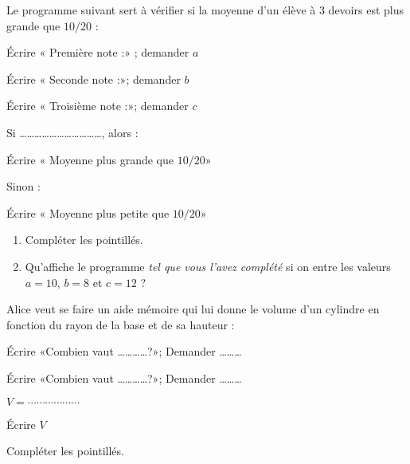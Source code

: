 
\begin{exercice}[\ldots/3]\label{exosmath-0599}

    \begin{multicols}{2}

    Le programme suivant sert à vérifier si la moyenne d'un élève à 3 devoirs est plus grande que \( 10/20\) :

    \begin{fmpage}{0.9\linewidth}

    Écrire « Première note :» ; demander \( a\)

    Écrire « Seconde note :»;   demander \( b\)

    Écrire « Troisième note :»; demander \( c\)

    Si \ldots\ldots\ldots\ldots\ldots\ldots\ldots\ldots\ldots\ldots\ldots , alors :

    \hspace{0.5cm} Écrire « Moyenne plus grande que \( 10/20\)» 

    Sinon :

    \hspace{0.5cm} Écrire « Moyenne plus petite que \( 10/20\)» 

\end{fmpage}

\begin{enumerate}
    \item
        Compléter les pointillés. 
    \item
        Qu'affiche le programme \emph{tel que vous l'avez complété} si on entre les valeurs \( a=10\), \( b=8\) et \( c=12\) ?        
\end{enumerate}

\columnbreak

    Alice veut se faire un aide mémoire qui lui donne le volume d'un cylindre en fonction du rayon de la base et de sa hauteur :

    \begin{fmpage}{0.9\linewidth}

    Écrire «Combien vaut \ldots\ldots\ldots\ldots ?»; Demander \ldots\ldots\ldots

    Écrire «Combien vaut \ldots\ldots\ldots\ldots ?»; Demander \ldots\ldots\ldots

    \( V=\cdots\cdots\cdots\cdots\cdots\cdots\)

    Écrire \( V\)

\end{fmpage}

Compléter les pointillés.

    \end{multicols}

\end{exercice}
